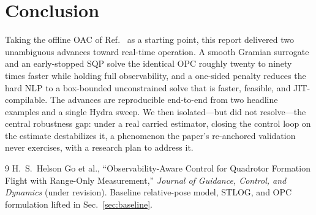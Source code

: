 \documentclass[11pt]{article}
\begin{document}
\section{Conclusion}\label{sec:conclusion}

Taking the offline OAC of Ref.~\cite{jgcd} as a starting point, this report delivered two
unambiguous advances toward real-time operation. A smooth Gramian surrogate and an early-stopped
SQP solve the identical OPC roughly twenty to ninety times faster while holding full observability,
and a one-sided penalty reduces the hard NLP to a box-bounded unconstrained solve that is faster,
feasible, and JIT-compilable. The advances are reproducible end-to-end from two headline examples
and a single Hydra sweep. We then isolated---but did not resolve---the central robustness gap:
under a real carried estimator, closing the control loop on the estimate destabilizes it, a
phenomenon the paper's re-anchored validation never exercises, with a research plan to address it.

\begin{thebibliography}{9}
 H.\ S.\ Helson Go et al., ``Observability-Aware Control for Quadrotor Formation
  Flight with Range-Only Measurement,'' \emph{Journal of Guidance, Control, and Dynamics} (under
  revision). Baseline relative-pose model, STLOG, and OPC formulation lifted in
  Sec.~\ref{sec:baseline}.
\end{thebibliography}
\end{document}
